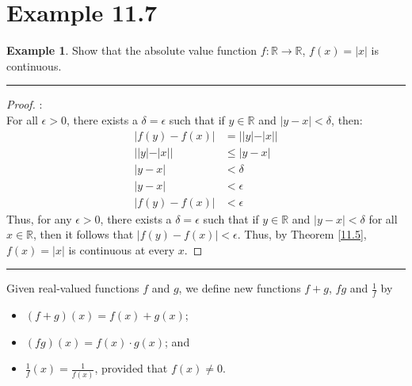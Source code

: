 \documentclass[openany, amssymb, psamsfonts]{amsart}
\newcommand{\bbR}{\mathbb{R}}
\newcommand{\abs}[1]{\lvert #1 \rvert}
\theoremstyle{definition}
\newtheorem{exmp}{Example}[section]
\numberwithin{equation}{section}
\begin{document}
\section*{Example 11.7}
\begin{exmp}
	Show that the absolute value function $f\colon \bbR \to \bbR$, $f(x) = \abs{x}$ is continuous.
\end{exmp}
   \vspace{4pt}     \hrule   \vspace{4pt}\begin{proof}:\\
For all $\epsilon>0$, there exists a $\delta = \epsilon$ such that if $y\in \bbR$ and $|y-x|< \delta$, then:
\begin{align*}
    |f(y)-f(x)|&= ||y|-|x||\\
\tag{Theorem 8.7}    ||y|-|x|| &\leq |y-x|\\
    |y-x|&< \delta\\
\tag{$\delta = \epsilon$} |y-x|&<\epsilon\\
    |f(y)-f(x)| &< \epsilon
\end{align*}
Thus, for any $\epsilon>0$, there exists a $\delta = \epsilon$ such that if $y\in \bbR$ and $|y-x|<\delta$ for all $x\in \bbR$, then it follows that $|f(y)-f(x)|<\epsilon$. Thus, by Theorem \ref{11.5}, $f(x) = |x|$ is continuous at every $x$.
\end{proof} \vspace{4pt}     \hrule   \vspace{4pt}
Given real-valued functions $f$ and $g$, we define new functions $f + g$, $fg$ and $\frac{1}{f}$ by
\begin{itemize}
	\item $(f + g)(x) = f(x) + g(x)$;
	\item $(f g)(x) = f(x) \cdot g(x)$; and
	\item $\frac{1}{f}(x) = \frac{1}{f(x)}$, provided that $f(x) \neq 0$.
\end{itemize}
\end{document}
